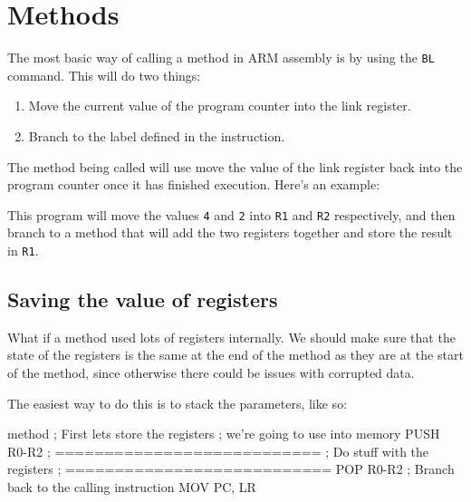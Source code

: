 \section{Methods}

The most basic way of calling a method in ARM assembly is by using the {\tt BL}
command. This will do two things:

\begin{enumerate}
	\item Move the current value of the program counter into the link register.
	\item Branch to the label defined in the instruction.
\end{enumerate}

The method being called will use move the value of the link register back into
the program counter once it has finished execution. Here's an example:


This program will move the values {\tt 4} and {\tt 2} into {\tt R1} and {\tt R2}
respectively, and then branch to a method that will add the two registers
together and store the result in {\tt R1}.

\subsection{Saving the value of registers}

What if a method used lots of registers internally. We should make sure that the
state of the registers is the same at the end of the method as they are at the
start of the method, since otherwise there could be issues with corrupted data.

The easiest way to do this is to stack the parameters, like so:

\begin{listing}{1}
method
	; First lets store the registers
	; we're going to use into memory
	PUSH 	{R0-R2}
	; ===========================
	; Do stuff with the registers
	; ===========================
	POP 	{R0-R2}
	; Branch back to the calling instruction
	MOV 	PC, LR
\end{listing}

